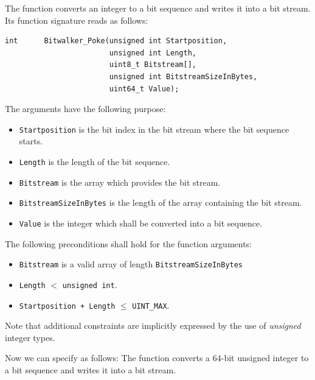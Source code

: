 The function \poke converts an integer to a bit sequence and writes it
into a bit stream.
Its function signature reads as follows:
\begin{lstlisting}[style = acsl-block]
int      Bitwalker_Poke(unsigned int Startposition,
                        unsigned int Length,
                        uint8_t Bitstream[],
                        unsigned int BitstreamSizeInBytes,
                        uint64_t Value);
\end{lstlisting}


The arguments have the following purpose:

\begin{itemize}
    \item \texttt{Startposition} is the bit index in the bit stream 
    where the bit sequence starts.
    \item \texttt{Length} is the length of the bit sequence.
    \item \texttt{Bitstream} is the array which provides the bit stream.
    \item \texttt{BitstreamSizeInBytes} is the length of the array 
    containing the bit stream. 
    \item \texttt{Value} is the integer which shall be converted into a bit sequence.
\end{itemize}


The following preconditions shall hold for the function arguments:

\begin{itemize}
\item \texttt{Bitstream} is a valid array of length \verb"BitstreamSizeInBytes"

\item \texttt{Length} $<$ \texttt{unsigned int}.

\item \texttt{Startposition + Length} $\leq$ \verb"UINT_MAX".
\end{itemize}

Note that additional constraints are implicitly expressed by the use
of \emph{unsigned} integer types.


Now we can specify \poke as follows:
The function \poke converts a 64-bit unsigned integer to a bit sequence and 
writes it into a bit stream.

